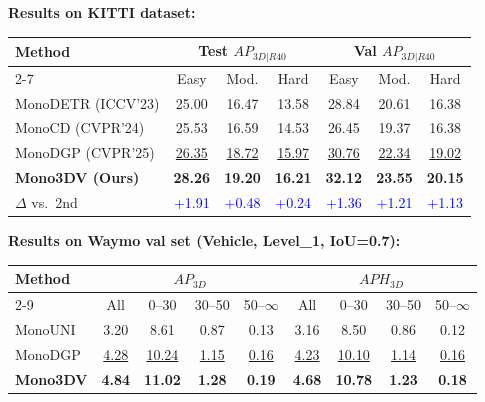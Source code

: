 \documentclass[portrait,a1paper,fontscale=0.42]{baposter}
\begin{document}
\begin{poster}
\begin{posterbox}[name=mono3dv, column=1, row=0]
\textbf{\color{blue}Results on KITTI dataset:}
\begin{center}
\small\setlength{\tabcolsep}{3pt}
\begin{tabular}{l|ccc|ccc}
  \hline
  \multirow{2}{*}{Method} & \multicolumn{3}{c|}{Test $AP_{3D|R40}$}
    & \multicolumn{3}{c}{Val $AP_{3D|R40}$} \\
  \cline{2-7}
   & Easy & Mod. & Hard & Easy & Mod. & Hard \\ \hline\hline
  MonoDETR (ICCV'23) & 25.00 & 16.47 & 13.58 & 28.84 & 20.61 & 16.38 \\
  MonoCD  (CVPR'24)  & 25.53 & 16.59 & 14.53 & 26.45 & 19.37 & 16.38 \\
  MonoDGP (CVPR'25)  & \underline{26.35} & \underline{18.72} & \underline{15.97}
    & \underline{30.76} & \underline{22.34} & \underline{19.02} \\
  \hline
  \textbf{Mono3DV (Ours)} & \textbf{28.26} & \textbf{19.20} & \textbf{16.21}
    & \textbf{32.12} & \textbf{23.55} & \textbf{20.15} \\
  $\Delta$ vs.\ 2nd & \textcolor{blue}{+1.91} & \textcolor{blue}{+0.48}
    & \textcolor{blue}{+0.24} & \textcolor{blue}{+1.36} & \textcolor{blue}{+1.21}
    & \textcolor{blue}{+1.13} \\
  \hline
\end{tabular}
\end{center}

\textbf{\color{blue}Results on Waymo val set (Vehicle, Level\_1, IoU=0.7):}
\begin{center}
\small\setlength{\tabcolsep}{3pt}
\begin{tabular}{l|cccc|cccc}
  \hline
  \multirow{2}{*}{Method} & \multicolumn{4}{c|}{$AP_{3D}$} & \multicolumn{4}{c}{$APH_{3D}$} \\
  \cline{2-9}
   & All & 0--30 & 30--50 & 50--$\infty$ & All & 0--30 & 30--50 & 50--$\infty$ \\ \hline\hline
  MonoUNI   & 3.20 & 8.61 & 0.87 & 0.13 & 3.16 & 8.50 & 0.86 & 0.12 \\
  MonoDGP   & \underline{4.28} & \underline{10.24} & \underline{1.15} & \underline{0.16}
            & \underline{4.23} & \underline{10.10} & \underline{1.14} & \underline{0.16} \\
  \hline
  \textbf{Mono3DV} & \textbf{4.84} & \textbf{11.02} & \textbf{1.28} & \textbf{0.19}
                   & \textbf{4.68} & \textbf{10.78} & \textbf{1.23} & \textbf{0.18} \\
  \hline
\end{tabular}
\end{center}


\end{posterbox}
\end{poster}
\end{document}
